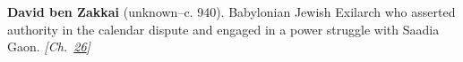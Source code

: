 \textbf{David ben Zakkai} (unknown–c. 940). Babylonian Jewish Exilarch who asserted authority in the calendar dispute and engaged in a power struggle with Saadia Gaon. \emph{[Ch.~\hyperref[ch:jewishcalendar]{26}]}

